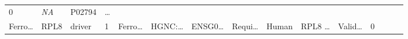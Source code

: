 \documentclass[
]{article}
\begin{document}
\begin{longtable}[]{@{}lllllllllllllll@{}}
\begin{minipage}[t]{0.05\columnwidth}
0\strut
\end{minipage} & \begin{minipage}[t]{0.05\columnwidth}\raggedright
\emph{NA}\strut
\end{minipage} & \begin{minipage}[t]{0.05\columnwidth}\raggedright
P02794\strut
\end{minipage} & \begin{minipage}[t]{0.02\columnwidth}\raggedright
\ldots{}\strut
\end{minipage}\tabularnewline
\begin{minipage}[t]{0.05\columnwidth}\raggedright
Ferro\ldots{}\strut
\end{minipage} & \begin{minipage}[t]{0.04\columnwidth}\raggedright
RPL8\strut
\end{minipage} & \begin{minipage}[t]{0.04\columnwidth}\raggedright
driver\strut
\end{minipage} & \begin{minipage}[t]{0.02\columnwidth}\raggedright
1\strut
\end{minipage} & \begin{minipage}[t]{0.05\columnwidth}\raggedright
Ferro\ldots{}\strut
\end{minipage} & \begin{minipage}[t]{0.05\columnwidth}\raggedright
HGNC:\ldots{}\strut
\end{minipage} & \begin{minipage}[t]{0.05\columnwidth}\raggedright
ENSG0\ldots{}\strut
\end{minipage} & \begin{minipage}[t]{0.05\columnwidth}\raggedright
Requi\ldots{}\strut
\end{minipage} & \begin{minipage}[t]{0.04\columnwidth}\raggedright
Human\strut
\end{minipage} & \begin{minipage}[t]{0.05\columnwidth}\raggedright
RPL8 \ldots{}\strut
\end{minipage} & \begin{minipage}[t]{0.05\columnwidth}\raggedright
Valid\ldots{}\strut
\end{minipage} & \begin{minipage}[t]{0.05\columnwidth}\raggedright
0\strut
\end{minipage} & \begin{minipage}[t]{0.05\columnwidth}\raggedright

\end{minipage}
\end{longtable}
\end{document}
